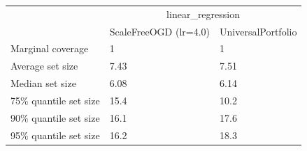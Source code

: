 \begin{tabular}{lll}
\toprule
& \multicolumn{2}{c}{linear_regression} \\
& ScaleFreeOGD (lr=4.0) & UniversalPortfolio \\
\midrule
Marginal coverage & 1 & 1 \\
Average set size & 7.43 & 7.51 \\
Median set size & 6.08 & 6.14 \\
75\% quantile set size & 15.4 & 10.2 \\
90\% quantile set size & 16.1 & 17.6 \\
95\% quantile set size & 16.2 & 18.3 \\
\bottomrule
\end{tabular}
